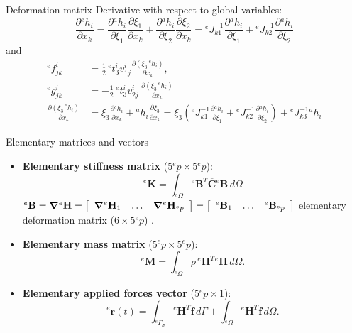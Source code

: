 \documentclass[aspectratio=169]{beamer}
\begin{document}
\begin{frame}{Deformation matrix}
  Derivative with respect to global variables:
  \[
    \frac{\partial {}^eh_i}{\partial x_k}
    = \frac{\partial {}^ah_i}{\partial \xi_1} \frac{\partial \xi_1}{\partial x_k}  + \frac{\partial {}^ah_i}{\partial \xi_2}\frac{\partial \xi_2}{\partial x_k}={}^eJ^{-1}_{k1} \frac{\partial {}^ah_i}{\partial \xi_1}
    + {}^eJ^{-1}_{k2} \frac{\partial {}^ah_i}{\partial \xi_2}
  \]
  and
  \begin{align*}
    {}^ef_{jk}^{i}  & = \frac{1}{2} \, {}^et_3^i v_{1j}^{i}\frac{\partial (\xi_3 \, {}^e h_i)}{\partial x_k},     \\
    {}^e g_{jk}^{i} & = -\frac{1}{2}  \, {}^et_3^i v_{2j}^{i}\, \frac{\partial (\xi_3 \, {}^e h_i)}{\partial x_k} \\
    \frac{\partial(\xi_3 \, {}^eh_i)}{\partial x_k}
                    & = \xi_3  \frac{\partial {}^eh_i}{\partial x_k}
    + {}^ah_i \frac{\partial \xi_3}{\partial x_k}=\xi_3  \left(
    {}^eJ^{-1}_{k1} \frac{\partial {}^ah_i}{\partial \xi_1}
    + {}^eJ^{-1}_{k2} \frac{\partial {}^ah_i}{\partial \xi_2}
    \right)
    + {}^eJ^{-1}_{k3} {}^ah_i
  \end{align*}
\end{frame}

{
\begin{frame}{Elementary matrices and vectors}
  \begin{block}{}
    \begin{itemize}
      \item \textbf{Elementary stiffness matrix} ($5{}^e p\times 5{}^e p$):
            $${}^e\mathbf K=\int_{{}^e\Omega} {}^e\mathbf B^T\overline{\mathbf C}{}^e\mathbf B \, d\Omega$$
            ${}^e\mathbf B=\boldsymbol{\nabla} {}^e\mathbf H=\left[
                \begin{array}{c;{2pt/2pt}c;{2pt/2pt}c}
                  \boldsymbol\nabla {}^e\mathbf H_1 & \dots & \boldsymbol\nabla {}^e\mathbf H_{{}^ep}
                \end{array} \right]=\left[
                \begin{array}{c;{2pt/2pt}c;{2pt/2pt}c}
                  {}^e\mathbf B_1 & \dots & {}^e\mathbf B_{{}^ep}
                \end{array} \right]$
            elementary deformation matrix ($6\times 5{}^e p$) .
      \item \textbf{Elementary mass matrix} ($5{}^e p\times 5{}^e p$):
            $${}^e\mathbf M=\int_{{}^e\Omega} \rho\, {}^e\mathbf H^T{}^e\mathbf H \, d\Omega.$$
      \item \textbf{Elementary applied forces vector} ($5{}^e p\times 1$):
            $${}^e\mathbf r(t)=\int_{{}^e\Gamma_\sigma} {}^e\mathbf H^{T}\mathbf{\hat f} \, d\Gamma+\int_{{}^e\Omega} {}^e\mathbf H^{T}\mathbf f\, d\Omega.$$
    \end{itemize}
  \end{block}
\end{frame}
}
\end{document}
